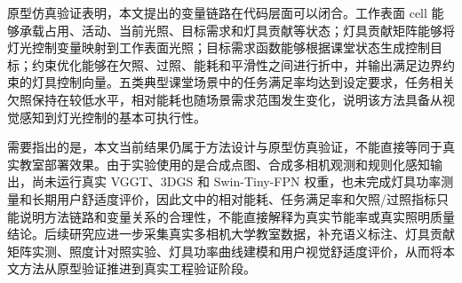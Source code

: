 \documentclass[UTF8,a4paper,zihao=-4]{ctexart}
\begin{document}
原型仿真验证表明，本文提出的变量链路在代码层面可以闭合。工作表面 cell 能够承载占用、活动、当前光照、目标需求和灯具贡献等状态；灯具贡献矩阵能够将灯光控制变量映射到工作表面光照；目标需求函数能够根据课堂状态生成控制目标；约束优化能够在欠照、过照、能耗和平滑性之间进行折中，并输出满足边界约束的灯具控制向量。五类典型课堂场景中的任务满足率均达到设定要求，任务相关欠照保持在较低水平，相对能耗也随场景需求范围发生变化，说明该方法具备从视觉感知到灯光控制的基本可执行性。

需要指出的是，本文当前结果仍属于方法设计与原型仿真验证，不能直接等同于真实教室部署效果。由于实验使用的是合成点图、合成多相机观测和规则化感知输出，尚未运行真实 VGGT、3DGS 和 Swin-Tiny-FPN 权重，也未完成灯具功率测量和长期用户舒适度评价，因此文中的相对能耗、任务满足率和欠照/过照指标只能说明方法链路和变量关系的合理性，不能直接解释为真实节能率或真实照明质量结论。后续研究应进一步采集真实多相机大学教室数据，补充语义标注、灯具贡献矩阵实测、照度计对照实验、灯具功率曲线建模和用户视觉舒适度评价，从而将本文方法从原型验证推进到真实工程验证阶段。

\begingroup
\sloppy

\endgroup
\end{document}
